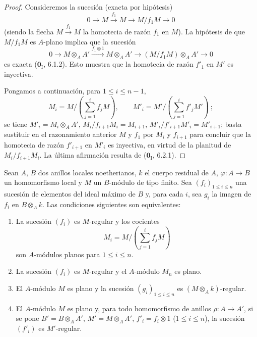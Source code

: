 \begin{proof}
Consideremos la sucesión (exacta por hipótesis)
\[
  0\longrightarrow M\xrightarrow{f_1}M\longrightarrow M/f_1M
  \longrightarrow0
\]
(siendo la flecha $M\xrightarrow{f_1}M$ la homotecia de razón $f_1$ en
$M$). La hipótesis de que $M/f_1M$ es $A$-plano implica que la sucesión
\[
  0\longrightarrow M\otimes_A A'
  \xrightarrow{f_1\otimes1}M\otimes_A A'
  \longrightarrow(M/f_1M)\otimes_A A'\longrightarrow0
\]
es exacta ($\mathbf{0}_{\mathrm I}$, 6.1.2). Esto muestra que la homotecia de razón
$f'_1$ en $M'$ es inyectiva.

Pongamos a continuación, para $1\leq i\leq n-1$,
\[
  M_i=M/\left(\sum_{j=1}^i f_jM\right),\qquad
  M'_i=M'/\left(\sum_{j=1}^i f'_jM'\right)~;
\]
se tiene $M'_i=M_i\otimes_A A'$, $M_i/f_{i+1}M_i=M_{i+1}$,
$M'_i/f'_{i+1}M'_i=M'_{i+1}$; basta sustituir en el razonamiento anterior
$M$ y $f_1$ por $M_i$ y $f_{i+1}$ para concluir que la homotecia de razón
$f'_{i+1}$ en $M'_i$ es inyectiva, en virtud de la planitud de
$M_i/f_{i+1}M_i$. La última afirmación resulta de ($\mathbf{0}_{\mathrm I}$, 6.2.1).
\end{proof}
\begin{proposition}[15.1.16]
\label{0.15.1.16-es}
Sean $A$, $B$ dos anillos locales noetherianos, $k$ el cuerpo residual de
$A$, $\varphi:A\to B$ un homomorfismo local y $M$ un $B$-módulo de tipo finito.
Sea $(f_i)_{1\leq i\leq n}$ una sucesión de elementos del ideal máximo de $B$
y, para cada $i$, sea $g_i$ la imagen de $f_i$ en $B\otimes_A k$. Las
condiciones siguientes son equivalentes:
\begin{enumerate}
  \item[\textup{a)}] La sucesión $(f_i)$ es $M$-regular y los cocientes
  \[
    M_i=M/\left(\sum_{j=1}^i f_jM\right)
  \]
  son $A$-módulos planos para $1\leq i\leq n$.
  \item[\textup{b)}] La sucesión $(f_i)$ es $M$-regular y el $A$-módulo $M_n$ es
  plano.
  \item[\textup{c)}] El $A$-módulo $M$ es plano y la sucesión
  $(g_i)_{1\leq i\leq n}$ es $(M\otimes_A k)$-regular.
  \item[\textup{d)}] El $A$-módulo $M$ es plano y, para todo homomorfismo de
  anillos $\rho:A\to A'$, si se pone $B'=B\otimes_A A'$,
  $M'=M\otimes_A A'$, $f'_i=f_i\otimes1$ \textup{($1\leq i\leq n$)}, la sucesión
  $(f'_i)$ es $M'$-regular.
\end{enumerate}
\end{proposition}

